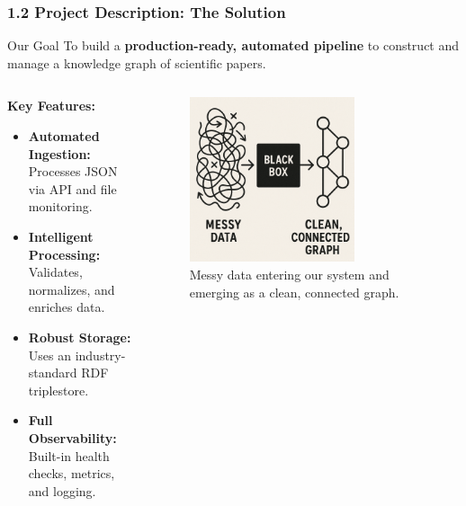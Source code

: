 \documentclass{beamer}
\begin{document}
\begin{frame}
    \frametitle{1.2 Project Description: The Solution}
    \small %

    \begin{block}{Our Goal}
        To build a \textbf{production-ready, automated pipeline} to construct and manage a knowledge graph of scientific papers.
    \end{block}

    \pause

    \begin{columns}[T]
        \begin{column}{0.5\textwidth}
            \textbf{Key Features:}
            \begin{itemize}
                \item<2-> \textbf{Automated Ingestion:} Processes JSON via API and file monitoring.
                \pause
                \item<3-> \textbf{Intelligent Processing:} Validates, normalizes, and enriches data.
                \pause
                \item<4-> \textbf{Robust Storage:} Uses an industry-standard RDF triplestore.
                \pause
                \item<5-> \textbf{Full Observability:} Built-in health checks, metrics, and logging.
            \end{itemize}
        \end{column}
        \begin{column}{0.5\textwidth}
            \begin{figure}
                \includegraphics[width=0.7\textwidth]{bbox.png}
                \caption{Messy data entering our system and emerging as a clean, connected graph.}
            \end{figure}
        \end{column}
    \end{columns}
\end{frame}
\end{document}

